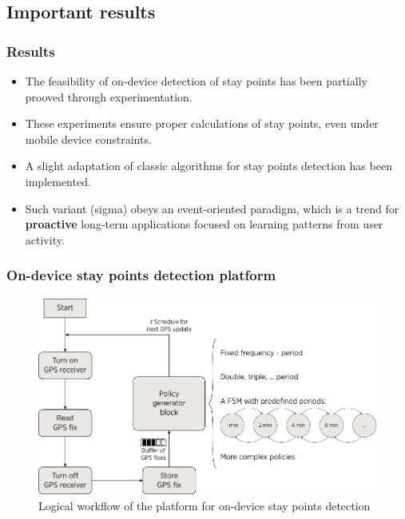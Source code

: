 \documentclass[compress,9pt,xcolor={dvipsnames,table}]{beamer}
\begin{document}
\subsection{Important results}
\label{sub:important_results}
\begin{frame}[t]\frametitle{Results}
\begin{itemize}
  \item The feasibility of on-device detection of stay points has been partially prooved through experimentation.
  \item These experiments ensure proper calculations of stay points, even under mobile device constraints.
  \item A slight adaptation of classic algorithms for stay points detection has been implemented.
  \item Such variant (sigma) obeys an event-oriented paradigm, which is a trend for \textbf{proactive} long-term applications focused on learning patterns from user activity.
\end{itemize}
\end{frame}

\begin{frame}[t]\frametitle{On-device stay points detection platform}
    
\begin{figure}[tb]
  \centering
  \includegraphics[scale=0.5]{../../../resources/images/vectors/policy-creator-methodology}
  \caption{Logical workflow of the platform for on-device stay points detection}
  \label{fig:logical-workflow}
\end{figure}

\end{frame}
\end{document}
